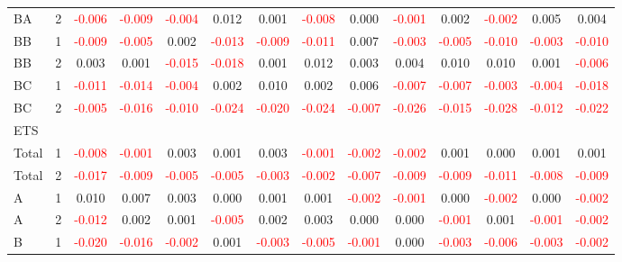 \begin{table}[H]
{\begin{tabular}{llcccccccccccc}
BA & 2 & \textcolor{red}{-0.006} & \textcolor{red}{-0.009} & \textcolor{red}{-0.004} & 0.012 & 0.001 & \textcolor{red}{-0.008} & 0.000 & \textcolor{red}{-0.001} & 0.002 & \textcolor{red}{-0.002} & 0.005 & 0.004\\
BB & 1 & \textcolor{red}{-0.009} & \textcolor{red}{-0.005} & 0.002 & \textcolor{red}{-0.013} & \textcolor{red}{-0.009} & \textcolor{red}{-0.011} & 0.007 & \textcolor{red}{-0.003} & \textcolor{red}{-0.005} & \textcolor{red}{-0.010} & \textcolor{red}{-0.003} & \textcolor{red}{-0.010}\\
BB & 2 & 0.003 & 0.001 & \textcolor{red}{-0.015} & \textcolor{red}{-0.018} & 0.001 & 0.012 & 0.003 & 0.004 & 0.010 & 0.010 & 0.001 & \textcolor{red}{-0.006}\\
BC & 1 & \textcolor{red}{-0.011} & \textcolor{red}{-0.014} & \textcolor{red}{-0.004} & 0.002 & 0.010 & 0.002 & 0.006 & \textcolor{red}{-0.007} & \textcolor{red}{-0.007} & \textcolor{red}{-0.003} & \textcolor{red}{-0.004} & \textcolor{red}{-0.018}\\
BC & 2 & \textcolor{red}{-0.005} & \textcolor{red}{-0.016} & \textcolor{red}{-0.010} & \textcolor{red}{-0.024} & \textcolor{red}{-0.020} & \textcolor{red}{-0.024} & \textcolor{red}{-0.007} & \textcolor{red}{-0.026} & \textcolor{red}{-0.015} & \textcolor{red}{-0.028} & \textcolor{red}{-0.012} & \textcolor{red}{-0.022}\\
\hline
ETS &  &  &  &  &  &  &  &  &  &  &  &  & \\
\hline
Total & 1 & \textcolor{red}{-0.008} & \textcolor{red}{-0.001} & 0.003 & 0.001 & 0.003 & \textcolor{red}{-0.001} & \textcolor{red}{-0.002} & \textcolor{red}{-0.002} & 0.001 & 0.000 & 0.001 & 0.001\\
Total & 2 & \textcolor{red}{-0.017} & \textcolor{red}{-0.009} & \textcolor{red}{-0.005} & \textcolor{red}{-0.005} & \textcolor{red}{-0.003} & \textcolor{red}{-0.002} & \textcolor{red}{-0.007} & \textcolor{red}{-0.009} & \textcolor{red}{-0.009} & \textcolor{red}{-0.011} & \textcolor{red}{-0.008} & \textcolor{red}{-0.009}\\
A & 1 & 0.010 & 0.007 & 0.003 & 0.000 & 0.001 & 0.001 & \textcolor{red}{-0.002} & \textcolor{red}{-0.001} & 0.000 & \textcolor{red}{-0.002} & 0.000 & \textcolor{red}{-0.002}\\
A & 2 & \textcolor{red}{-0.012} & 0.002 & 0.001 & \textcolor{red}{-0.005} & 0.002 & 0.003 & 0.000 & 0.000 & \textcolor{red}{-0.001} & 0.001 & \textcolor{red}{-0.001} & \textcolor{red}{-0.002}\\
B & 1 & \textcolor{red}{-0.020} & \textcolor{red}{-0.016} & \textcolor{red}{-0.002} & 0.001 & \textcolor{red}{-0.003} & \textcolor{red}{-0.005} & \textcolor{red}{-0.001} & 0.000 & \textcolor{red}{-0.003} & \textcolor{red}{-0.006} & \textcolor{red}{-0.003} & \textcolor{red}{-0.002}\\

\end{tabular}}
\end{table}
